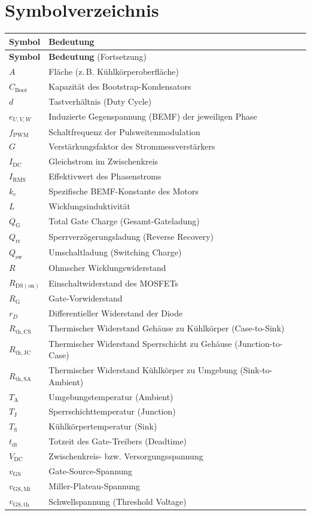 \chapter*{Symbolverzeichnis}

\begin{longtable}{@{\hskip-35pt}lp{12.5cm}}
\textbf{Symbol} & \textbf{Bedeutung} \\[1ex]
\endfirsthead
\textbf{Symbol} & \textbf{Bedeutung} (Fortsetzung) \\[1ex]
\endhead
$A$ & Fläche (z.\,B. Kühlkörperoberfläche) \\
$C_{\mathrm{Boot}}$ & Kapazität des Bootstrap-Kondensators \\
$d$ & Tastverhältnis (Duty Cycle) \\
$e_{U,V,W}$ & Induzierte Gegenspannung (BEMF) der jeweiligen Phase \\
$f_{\mathrm{PWM}}$ & Schaltfrequenz der Pulsweitenmodulation \\
$G$ & Verstärkungsfaktor des Strommessverstärkers \\
$I_{\mathrm{DC}}$ & Gleichstrom im Zwischenkreis \\
$I_{\mathrm{RMS}}$ & Effektivwert des Phasenstroms \\
$k_{e}$ & Spezifische BEMF-Konstante des Motors \\
$L$ & Wicklungsinduktivität \\
$Q_{\mathrm{G}}$ & Total Gate Charge (Gesamt-Gateladung) \\
$Q_{\mathrm{rr}}$ & Sperrverzögerungsladung (Reverse Recovery) \\
$Q_{\mathrm{sw}}$ & Umschaltladung (Switching Charge) \\
$R$ & Ohmscher Wicklungswiderstand \\
$R_{\mathrm{DS(on)}}$ & Einschaltwiderstand des MOSFETs \\
$R_{\mathrm{G}}$ & Gate-Vorwiderstand \\
$r_{D}$ & Differentieller Widerstand der Diode \\
$R_{\mathrm{th,CS}}$ & Thermischer Widerstand Gehäuse zu Kühlkörper (Case-to-Sink) \\
$R_{\mathrm{th,JC}}$ & Thermischer Widerstand Sperrschicht zu Gehäuse (Junction-to-Case) \\
$R_{\mathrm{th,SA}}$ & Thermischer Widerstand Kühlkörper zu Umgebung (Sink-to-Ambient) \\
$T_{\mathrm{A}}$ & Umgebungstemperatur (Ambient) \\
$T_{\mathrm{J}}$ & Sperrschichttemperatur (Junction) \\
$T_{\mathrm{S}}$ & Kühlkörpertemperatur (Sink) \\
$t_{\mathrm{dt}}$ & Totzeit des Gate-Treibers (Deadtime) \\
$V_{\mathrm{DC}}$ & Zwischenkreis- bzw. Versorgungsspannung \\
$v_{\mathrm{GS}}$ & Gate-Source-Spannung \\
$v_{\mathrm{GS,Mi}}$ & Miller-Plateau-Spannung \\
$v_{\mathrm{GS,th}}$ & Schwellspannung (Threshold Voltage) \\
\end{longtable}